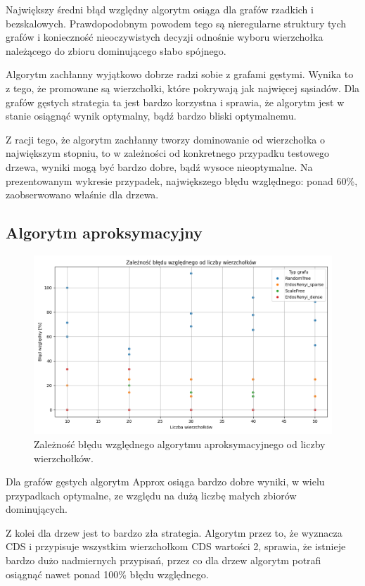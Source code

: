 Największy średni błąd względny algorytm osiąga dla grafów rzadkich i bezskalowych. Prawdopodobnym powodem tego są nieregularne struktury tych grafów i konieczność nieoczywistych decyzji odnośnie wyboru wierzchołka należącego do zbioru dominującego słabo spójnego.

Algorytm zachłanny wyjątkowo dobrze radzi sobie z grafami gęstymi. Wynika to z tego, że promowane są wierzchołki, które pokrywają jak najwięcej sąsiadów. Dla grafów gęstych strategia ta jest bardzo korzystna i sprawia, że algorytm jest w stanie osiągnąć wynik optymalny, bądź bardzo bliski optymalnemu.

Z racji tego, że algorytm zachłanny tworzy dominowanie od wierzchołka o największym stopniu, to w zależności od konkretnego przypadku testowego drzewa, wyniki mogą być bardzo dobre, bądź wysoce nieoptymalne. Na prezentowanym wykresie przypadek, największego błędu względnego: ponad 60\%, zaobserwowano właśnie dla drzewa.  

\subsection{Algorytm aproksymacyjny}

\begin{figure}[H]
    \centering
    \includegraphics[width=\textwidth]{assets/plots_approx/approx.png}
    \caption{Zależność błędu względnego algorytmu aproksymacyjnego od liczby wierzchołków.}
    \label{fig:approxPlot}
\end{figure}

Dla grafów gęstych algorytm Approx osiąga bardzo dobre wyniki, w wielu przypadkach optymalne, ze względu na dużą liczbę małych zbiorów dominujących.

Z kolei dla drzew jest to bardzo zła strategia. Algorytm przez to, że wyznacza CDS i przypisuje wszystkim wierzchołkom CDS wartości 2, sprawia, że istnieje bardzo dużo nadmiernych przypisań, przez co dla drzew algorytm potrafi osiągnąć nawet ponad 100\% błędu względnego.

